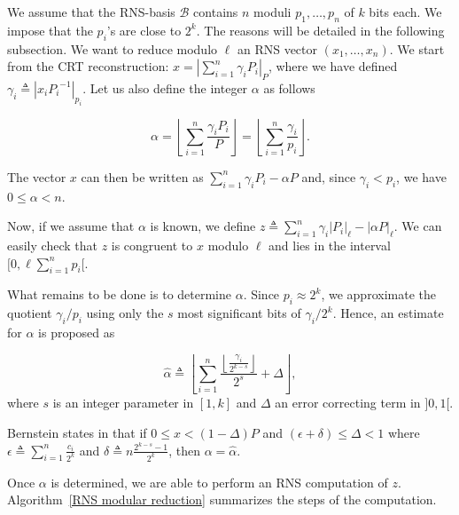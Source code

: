 \documentclass[runningheads,orivec]{llncs}
\begin{document}
We assume that the RNS-basis $\mathcal{B}$ contains $n$ moduli $p_1,\dots,p_n$ of $k$ bits each. We impose that the $p_i$'s are close to $2^k$. The reasons will be detailed in the following subsection. We want to reduce modulo $\ell$ an RNS vector $(x_1,\dots,x_n)$. We start from the CRT reconstruction:  
 $x = \displaystyle \left|\sum_{i=1}^{n}{\gamma_i P_i} \right|_ {P}$, where we have defined $\gamma_i \triangleq {\left|{x_iP_i}^{-1}\right|_{p_i}}$. Let us also define the integer $\alpha$ as follows 

\begin{equation}
\alpha = \left \lfloor \displaystyle \sum_{i=1}^{n} { \displaystyle\frac{\gamma_i P_i}{P}} \right \rfloor = \left \lfloor \displaystyle \sum_{i=1}^{n} { \displaystyle\frac{\gamma_i}{p_i}} \right \rfloor.
\end{equation}

The vector $x$ can then be written as $\displaystyle\sum_{i=1}^{n}{\gamma_i{P_i}} - \alpha P$ and, since $\gamma_i < p_i$, we have $ 0 \leq \alpha < n$.
 
Now, if we assume that $\alpha$ is known, we define $\displaystyle {z \triangleq \sum_{i=1}^{n}{\gamma_i\left|P_i\right|_{\ell}} - \left|\alpha P\right|_{\ell}}$. We can easily check that $z$ is congruent to $x$ modulo $\ell$ and lies in the interval $[0,\ell \displaystyle\sum_{i=1}^{n}{p_i}[$.

What remains to be done is to determine $\alpha$.
Since $p_i \approx 2^k$, we approximate the quotient $\gamma_i / p_i$ using only the $s$ most significant bits of $\gamma_i / 2^k$. Hence, an estimate for $\alpha$ is proposed as

\begin{equation}
\hat{\alpha}\triangleq \displaystyle \left\lfloor { \sum_{i=1}^{n} { \displaystyle \frac{\left \lfloor \displaystyle \frac{\gamma_i}{2^{k-s}} \right \rfloor} {2^s} + \Delta}}\right\rfloor,
\end{equation}
where $s$ is an integer parameter in $[1,k]$ and $\Delta$ an error correcting term in $]0,1[$. 

Bernstein states in \cite{BERN95} that if $0\leq x<(1-\Delta) P$ and $(\epsilon + \delta) \leq \Delta < 1$ where $\epsilon \triangleq \displaystyle \sum_{i=1}^{n} \displaystyle \frac{c_i}{2^k}$ and $ \delta \triangleq n \displaystyle \frac{2^{k-s}-1}{2^k} $, then $\alpha = \hat{\alpha}$.  

Once $\alpha$ is determined, we are able to perform an RNS computation of $z$. Algorithm~\ref{RNS modular reduction} summarizes the steps of the computation. 
  
\end{document}
